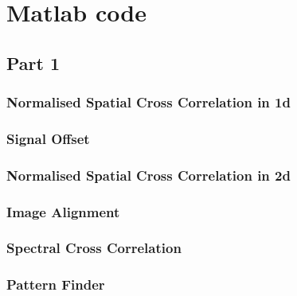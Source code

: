 \chapter{Matlab code }
\section{Part 1}
\subsection{Normalised Spatial Cross Correlation in 1d}
 \label{code:1.1}

\subsection{Signal Offset}
 \label{code:1.2}

\subsection{Normalised Spatial Cross Correlation in 2d}
 \label{code:1.3}

\subsection{Image Alignment}
 \label{code:1.4}

\subsection{Spectral Cross Correlation}
 \label{code:1.5}

\subsection{Pattern Finder}
 \label{code:1.6}
